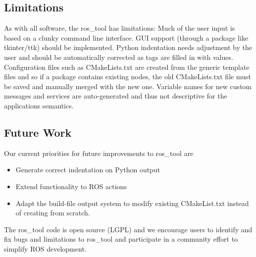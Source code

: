 \documentclass[letterpaper, 10 pt, conference]{ieeeconf}  %
\begin{document}
\subsection{Limitations}
As with all software, the ros\_tool has limitations:
Much of the user input is based on a clunky command line interface.  GUI support (through a package like tkinter/ttk) should be implemented.
Python indentation needs adjustment by the user and should be automatically corrected as tags are filled in with values.
Configuration files such as CMakeLists.txt are created from the generic template files and so if a package contains existing nodes, the old CMakeLists.txt file must be saved and manually merged with the new one.
Variable names for new custom messages and services are auto-generated and thus not descriptive for the applications semantics.

\subsection{Future Work }
Our current priorities for future improvements to ros\_tool are
\begin{itemize}
 \item Generate correct indentation on Python output
 \item Extend functionality to ROS actions
 \item Adapt the build-file output system to modify existing CMakeList.txt instead of creating from scratch.
\end{itemize}

The ros\_tool code is open source (LGPL) and we encourage users to identify and fix bugs and limitations to ros\_tool and participate in a community effort to simplify ROS development.
\end{document}
